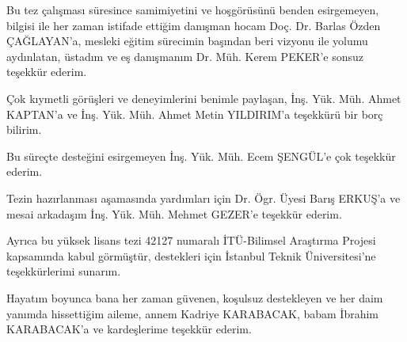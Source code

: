 Bu tez çalışması süresince samimiyetini ve hoşgörüsünü benden esirgemeyen,
bilgisi ile her zaman istifade ettiğim danışman hocam Doç. Dr. Barlas
Özden ÇAĞLAYAN’a, mesleki eğitim sürecimin başından beri vizyonu ile
yolumu aydınlatan, üstadım ve eş danışmanım Dr. Müh. Kerem PEKER’e
sonsuz teşekkür ederim.

Çok kıymetli görüşleri ve deneyimlerini benimle paylaşan, İnş. Yük.
Müh. Ahmet KAPTAN’a ve İnş. Yük. Müh. Ahmet Metin YILDIRIM’a teşekkürü
bir borç bilirim.

Bu süreçte desteğini esirgemeyen İnş. Yük. Müh. Ecem ŞENGÜL’e çok
teşekkür ederim.

Tezin hazırlanması aşamasında yardımları için Dr. Ögr. Üyesi Barış
ERKUŞ’a ve mesai arkadaşım İnş. Yük. Müh. Mehmet GEZER’e teşekkür
ederim.

Ayrıca bu yüksek lisans tezi 42127 numaralı İTÜ-Bilimsel Araştırma
Projesi kapsamında kabul görmüştür, destekleri için İstanbul Teknik
Üniversitesi’ne teşekkürlerimi sunarım.

Hayatım boyunca bana her zaman güvenen, koşulsuz destekleyen ve her
daim yanımda hissettiğim aileme, annem Kadriye KARABACAK, babam İbrahim
KARABACAK’a ve kardeşlerime teşekkür ederim.